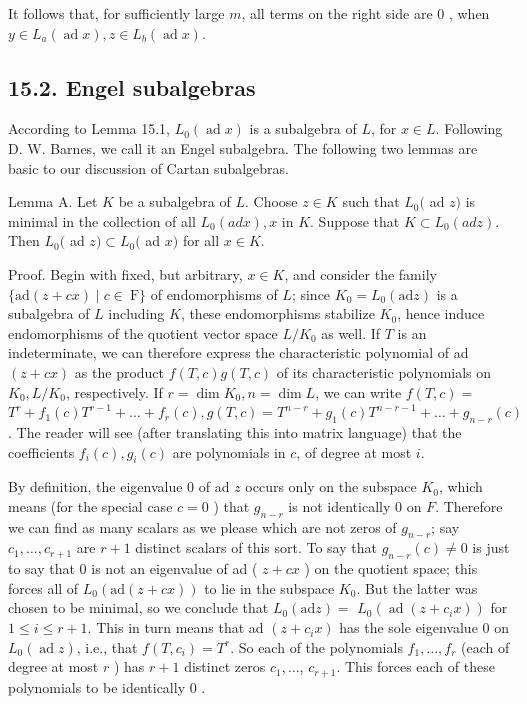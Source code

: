 \documentclass[10pt]{article}
\begin{document}
It follows that, for sufficiently large $m$, all terms on the right side are 0 , when $y \in L_{a}(\operatorname{ad} x), z \in L_{b}(\operatorname{ad} x)$.

\subsection*{15.2. Engel subalgebras}
According to Lemma 15.1, $L_{0}(\operatorname{ad} x)$ is a subalgebra of $L$, for $x \in L$. Following D. W. Barnes, we call it an Engel subalgebra. The following two lemmas are basic to our discussion of Cartan subalgebras.

Lemma A. Let $K$ be a subalgebra of $L$. Choose $z \in K$ such that $L_{0}($ ad $z)$ is minimal in the collection of all $L_{0}(a d x), x$ in $K$. Suppose that $K \subset L_{0}(a d z)$. Then $L_{0}($ ad $z) \subset L_{0}($ ad $x)$ for all $x \in K$.

Proof. Begin with fixed, but arbitrary, $x \in K$, and consider the family $\{\mathrm{ad}(z+c x) \mid c \in \mathrm{~F}\}$ of endomorphisms of $L$; since $K_{0}=L_{0}(\mathrm{ad} z)$ is a subalgebra of $L$ including $K$, these endomorphisms stabilize $K_{0}$, hence induce endomorphisms of the quotient vector space $L / K_{0}$ as well. If $T$ is an indeterminate, we can therefore express the characteristic polynomial of ad $(z+c x)$ as the product $f(T, c) g(T, c)$ of its characteristic polynomials on $K_{0}, L / K_{0}$, respectively. If $r=\operatorname{dim} K_{0}, n=\operatorname{dim} L$, we can write $f(T, c)=$ $T^{r}+f_{1}(c) T^{r-1}+\ldots+f_{r}(c), g(T, c)=T^{n-r}+g_{1}(c) T^{n-r-1}+\ldots+g_{n-r}(c)$. The reader will see (after translating this into matrix language) that the coefficients $f_{i}(c), g_{i}(c)$ are polynomials in $c$, of degree at most $i$.

By definition, the eigenvalue 0 of ad $z$ occurs only on the subspace $K_{0}$, which means (for the special case $c=0$ ) that $g_{n-r}$ is not identically 0 on $F$. Therefore we can find as many scalars as we please which are not zeros of $g_{n-r}$; say $c_{1}, \ldots, c_{r+1}$ are $r+1$ distinct scalars of this sort. To say that $g_{n-r}(c) \neq 0$ is just to say that 0 is not an eigenvalue of ad ( $z+c x$ ) on the quotient space; this forces all of $L_{0}(\mathrm{ad}(z+c x))$ to lie in the subspace $K_{0}$. But the latter was chosen to be minimal, so we conclude that $L_{0}(\mathrm{ad} z)=$ $L_{0}\left(\operatorname{ad}\left(z+c_{i} x\right)\right)$ for $1 \leq i \leq r+1$. This in turn means that ad $\left(z+c_{i} x\right)$ has the sole eigenvalue 0 on $L_{0}(\operatorname{ad} z)$, i.e., that $f\left(T, c_{i}\right)=T^{r}$. So each of the polynomials $f_{1}, \ldots, f_{r}$ (each of degree at most $r$ ) has $r+1$ distinct zeros $c_{1}, \ldots$, $c_{r+1}$. This forces each of these polynomials to be identically 0 .
\end{document}
